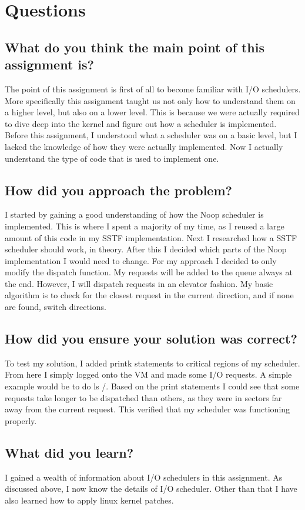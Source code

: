 \documentclass[letterpaper,10pt,titlepage,draftclsnofoot,onecolumn]{IEEEtran}
\begin{document}
\section{Questions}
\subsection{What do you think the main point of this assignment is?}

The point of this assignment is first of all to become familiar with I/O schedulers. More specifically this assignment taught us not only how to understand them on a higher level, but also on a lower level. This is because we were actually required to dive deep into the kernel and figure out how a scheduler is implemented. Before this assignment, I understood what a scheduler was on a basic level, but I lacked the knowledge of how they were actually implemented. Now I actually understand the type of code that is used to implement one. 

\subsection{How did you approach the problem?}
I started by gaining a good understanding of how the Noop scheduler is implemented. This is where I spent a majority of my time, as I reused a large amount of this code in my SSTF implementation. Next I researched how a SSTF scheduler should work, in theory. After this I decided which parts of the Noop implementation I would need to change. For my approach I decided to only modify the dispatch function. My requests will be added to the queue always at the end. However, I will dispatch requests in an elevator fashion. My basic algorithm is to check for the closest request in the current direction, and if none are found, switch directions. 

\subsection{How did you ensure your solution was correct?}
To test my solution, I added printk statements to critical regions of my scheduler. From here I simply logged onto the VM and made some I/O requests. A simple example would be to do ls /. Based on the print statements I could see that some requests take longer to be dispatched than others, as they were in sectors far away from the current request. This verified that my scheduler was functioning properly.

\subsection{What did you learn?}
I gained a wealth of information about I/O schedulers in this assignment. As discussed above, I now know the details of I/O scheduler. Other than that I have also learned how to apply linux kernel patches.
\end{document}
